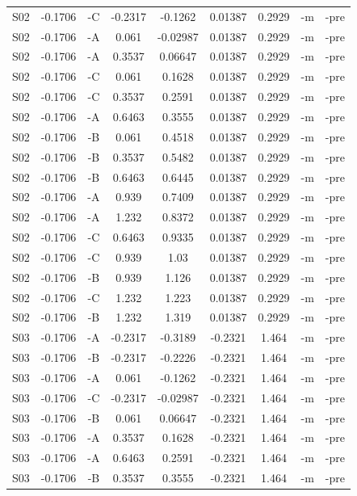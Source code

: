 \documentclass[\pandocDocMode,longtable,noextraspace,floatsintext]{apa6}
\begin{document}
\begin{longtable}[]{@{}ccccccccc@{}}
S02 & -0.1706 & -C & -0.2317 & -0.1262 & 0.01387 & 0.2929 & -m & -pre \\
S02 & -0.1706 & -A & 0.061 & -0.02987 & 0.01387 & 0.2929 & -m & -pre \\
S02 & -0.1706 & -A & 0.3537 & 0.06647 & 0.01387 & 0.2929 & -m & -pre \\
S02 & -0.1706 & -C & 0.061 & 0.1628 & 0.01387 & 0.2929 & -m & -pre \\
S02 & -0.1706 & -C & 0.3537 & 0.2591 & 0.01387 & 0.2929 & -m & -pre \\
S02 & -0.1706 & -A & 0.6463 & 0.3555 & 0.01387 & 0.2929 & -m & -pre \\
S02 & -0.1706 & -B & 0.061 & 0.4518 & 0.01387 & 0.2929 & -m & -pre \\
S02 & -0.1706 & -B & 0.3537 & 0.5482 & 0.01387 & 0.2929 & -m & -pre \\
S02 & -0.1706 & -B & 0.6463 & 0.6445 & 0.01387 & 0.2929 & -m & -pre \\
S02 & -0.1706 & -A & 0.939 & 0.7409 & 0.01387 & 0.2929 & -m & -pre \\
S02 & -0.1706 & -A & 1.232 & 0.8372 & 0.01387 & 0.2929 & -m & -pre \\
S02 & -0.1706 & -C & 0.6463 & 0.9335 & 0.01387 & 0.2929 & -m & -pre \\
S02 & -0.1706 & -C & 0.939 & 1.03 & 0.01387 & 0.2929 & -m & -pre \\
S02 & -0.1706 & -B & 0.939 & 1.126 & 0.01387 & 0.2929 & -m & -pre \\
S02 & -0.1706 & -C & 1.232 & 1.223 & 0.01387 & 0.2929 & -m & -pre \\
S02 & -0.1706 & -B & 1.232 & 1.319 & 0.01387 & 0.2929 & -m & -pre \\
S03 & -0.1706 & -A & -0.2317 & -0.3189 & -0.2321 & 1.464 & -m & -pre \\
S03 & -0.1706 & -B & -0.2317 & -0.2226 & -0.2321 & 1.464 & -m & -pre \\
S03 & -0.1706 & -A & 0.061 & -0.1262 & -0.2321 & 1.464 & -m & -pre \\
S03 & -0.1706 & -C & -0.2317 & -0.02987 & -0.2321 & 1.464 & -m & -pre \\
S03 & -0.1706 & -B & 0.061 & 0.06647 & -0.2321 & 1.464 & -m & -pre \\
S03 & -0.1706 & -A & 0.3537 & 0.1628 & -0.2321 & 1.464 & -m & -pre \\
S03 & -0.1706 & -A & 0.6463 & 0.2591 & -0.2321 & 1.464 & -m & -pre \\
S03 & -0.1706 & -B & 0.3537 & 0.3555 & -0.2321 & 1.464 & -m & -pre \\

\end{longtable}
\end{document}
